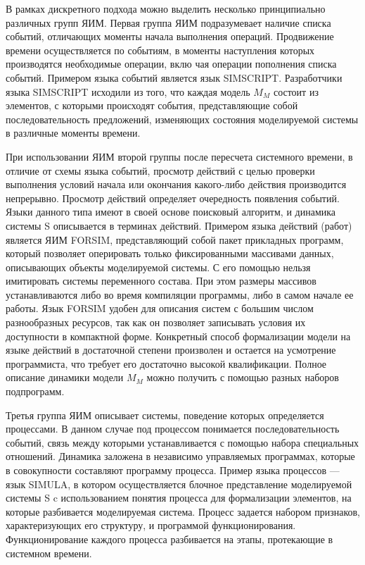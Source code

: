     В рамках дискретного подхода можно выделить несколько принципиально различных групп ЯИМ. Первая группа ЯИМ подразумевает наличие списка событий, отличающих моменты начала выполнения операций. Продвижение времени осуществляется по событиям, в моменты наступления которых производятся необходимые операции, вклю­
чая операции пополнения списка событий. Примером языка событий является язык SIMSCRIPT. Разработчики языка SIMSCRIPT исходили из того, что каждая модель $M_{M}$ состоит из элементов, с которыми происходят события, представляющие собой последовательность предложений, изменяющих состояния моделируемой системы в различные моменты времени.

    При использовании ЯИМ второй группы после пересчета системного времени, в отличие от схемы языка событий, просмотр действий с целью проверки выполнения условий начала или окончания какого-либо действия производится непрерывно. Просмотр действий определяет очередность появления событий. Языки данного типа имеют в своей основе поисковый алгоритм, и динамика системы S описывается в терминах действий. Примером языка действий (работ) является ЯИМ FORSIM, представляющий собой пакет прикладных программ, который позволяет оперировать только фиксированными массивами данных, описывающих объекты моделируемой системы. С его помощью нельзя имитировать системы переменного состава. При этом размеры массивов  устанавливаются либо во время компиляции программы, либо в самом начале ее работы. Язык FORSIM удобен для описания систем с большим числом разнообразных ресурсов, так как он позволяет записывать условия их доступности в компактной форме. Конкретный способ формализации модели на языке действий в достаточной степени произволен и остается на усмотрение программиста, что требует его достаточно высокой квалификации. Полное описание динамики модели $M_{M}$ можно получить с помощью разных наборов подпрограмм.

    Третья группа ЯИМ описывает системы, поведение которых определяется процессами. В данном случае под процессом понимается последовательность событий, связь между которыми устанавливается с помощью набора специальных отношений. Динамика заложена в независимо управляемых программах, которые в совокупности составляют программу процесса. Пример языка процессов — язык SIMULA, в котором осуществляется блочное представление моделируемой системы S c использованием понятия процесса для формализации элементов, на которые разбивается моделируемая система. Процесс задается набором признаков, характеризующих его структуру, и программой функционирования. Функционирование каждого процесса разбивается на этапы, протекающие в системном времени.

